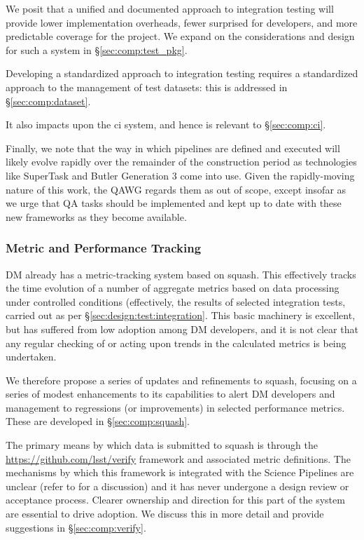 We posit that a unified and documented approach to integration testing will
provide lower implementation overheads, fewer surprised for developers, and
more predictable coverage for the project. We expand on the considerations and
design for such a system in \S\ref{sec:comp:test_pkg}.

Developing a standardized approach to integration testing requires a
standardized approach to the management of test datasets: this is addressed in
\S\ref{sec:comp:dataset}.

It also impacts upon the \gls{ci} system, and hence is relevant to
\S\ref{sec:comp:ci}.

Finally, we note that the way in which pipelines are defined and executed will
likely evolve rapidly over the remainder of the construction period as
technologies like SuperTask and Butler Generation 3 come into use. Given the
rapidly-moving nature of this work, the QAWG regards them as out of scope,
except insofar as we urge that QA tasks should be implemented and kept up to
date with these new frameworks as they become available.

\subsubsection{Metric and Performance Tracking}

DM already has a metric-tracking system based on \gls{squash}. This
effectively tracks the time evolution of a number of \glspl{aggregate metric}
based on data processing under controlled conditions (effectively, the results
of selected integration tests, carried out as per
\S\ref{sec:design:test:integration}. This basic machinery is excellent, but
has suffered from low adoption among DM developers, and it is not clear that
any regular checking of or acting upon trends in the calculated metrics is
being undertaken.

We therefore propose a series of updates and refinements to \gls{squash},
focusing on a series of modest enhancements to its capabilities to alert DM
developers and management to regressions (or improvements) in selected
performance metrics. These are developed in \S\ref{sec:comp:squash}.

The primary means by which data is submitted to \gls{squash} is through the
\href{lsst.verify}{https://github.com/lsst/verify} framework and associated
metric definitions. The mechanisms by which this framework is integrated with
the Science Pipelines are unclear (refer to  for a
discussion) and it has never undergone a design review or acceptance process.
Clearer ownership and direction for this part of the system are essential to
drive adoption. We discuss this in more detail and provide suggestions in
\S\ref{sec:comp:verify}.
